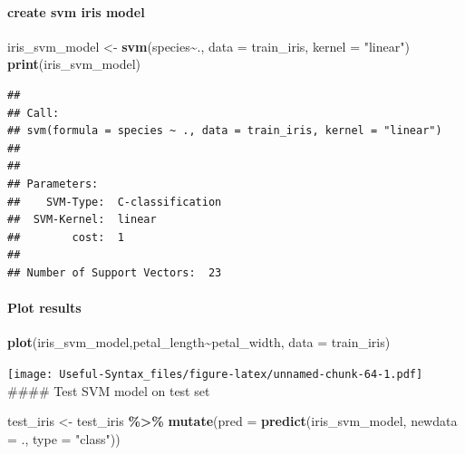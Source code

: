 \documentclass[
]{article}
\newenvironment{Shaded}{\begin{snugshade}}{\end{snugshade}}
\newcommand{\AttributeTok}[1]{\textcolor[rgb]{0.13,0.29,0.53}{#1}}
\newcommand{\FunctionTok}[1]{\textcolor[rgb]{0.13,0.29,0.53}{\textbf{#1}}}
\newcommand{\NormalTok}[1]{#1}
\newcommand{\OtherTok}[1]{\textcolor[rgb]{0.56,0.35,0.01}{#1}}
\newcommand{\SpecialCharTok}[1]{\textcolor[rgb]{0.81,0.36,0.00}{\textbf{#1}}}
\newcommand{\StringTok}[1]{\textcolor[rgb]{0.31,0.60,0.02}{#1}}
\begin{document}
\hypertarget{create-svm-iris-model}{%
\paragraph{create svm iris model}\label{create-svm-iris-model}}

\begin{Shaded}
\begin{Highlighting}[]
\NormalTok{iris\_svm\_model }\OtherTok{\textless{}{-}} \FunctionTok{svm}\NormalTok{(species}\SpecialCharTok{\textasciitilde{}}\NormalTok{., }\AttributeTok{data =}\NormalTok{ train\_iris, }\AttributeTok{kernel =} \StringTok{"linear"}\NormalTok{)}
\FunctionTok{print}\NormalTok{(iris\_svm\_model)}
\end{Highlighting}
\end{Shaded}

\begin{verbatim}
## 
## Call:
## svm(formula = species ~ ., data = train_iris, kernel = "linear")
## 
## 
## Parameters:
##    SVM-Type:  C-classification 
##  SVM-Kernel:  linear 
##        cost:  1 
## 
## Number of Support Vectors:  23
\end{verbatim}

\hypertarget{plot-results}{%
\paragraph{Plot results}\label{plot-results}}

\begin{Shaded}
\begin{Highlighting}[]
\FunctionTok{plot}\NormalTok{(iris\_svm\_model,petal\_length}\SpecialCharTok{\textasciitilde{}}\NormalTok{petal\_width, }\AttributeTok{data =}\NormalTok{ train\_iris)}
\end{Highlighting}
\end{Shaded}

\texttt{[image: Useful-Syntax\_files/figure-latex/unnamed-chunk-64-1.pdf]}
\#\#\#\# Test SVM model on test set

\begin{Shaded}
\begin{Highlighting}[]
\NormalTok{test\_iris }\OtherTok{\textless{}{-}}\NormalTok{ test\_iris }\SpecialCharTok{\%\textgreater{}\%}
  \FunctionTok{mutate}\NormalTok{(}\AttributeTok{pred =} \FunctionTok{predict}\NormalTok{(iris\_svm\_model, }\AttributeTok{newdata =}\NormalTok{ ., }\AttributeTok{type =} \StringTok{"class"}\NormalTok{))}
\end{Highlighting}
\end{Shaded}
\end{document}
